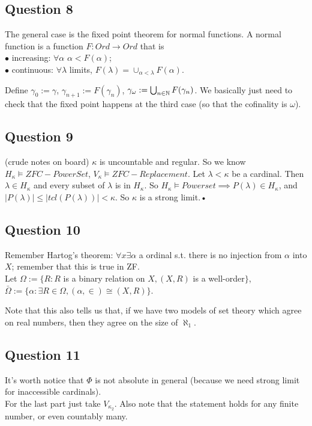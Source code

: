 \documentclass[a4paper]{article}
\begin{document}
\subsection{Question 8}
The general case is the fixed point theorem for normal functions. A normal function is a function $F:Ord \to Ord$ that is\\
$\bullet$ increasing: $\forall \alpha$ $\alpha < F(\alpha)$;\\
$\bullet$ continuous: $\forall \lambda$ limits, $F(\lambda) = \cup_{\alpha < \lambda} F(\alpha)$.

Define $\gamma_0 := \gamma$, $\gamma_{n+1} := F(\gamma_n)$, $\gamma_\omega := \bigcup_{n \in \mathbb{N}} F(\gamma_n)$. We basically just need to check that the fixed point happens at the third case (so that the cofinality is $\omega$).

\subsection{Question 9}
(crude notes on board) $\kappa$ is uncountable and regular. So we know $H_\kappa \vDash ZFC-PowerSet$, $V_\kappa \vDash ZFC-Replacement$. Let $\lambda < \kappa$ be a cardinal. Then $\lambda \in H_\kappa$ and every subset of $\lambda$ is in $H_\kappa$. So $H_\kappa \vDash Powerset \implies P(\lambda) \in H_\kappa$, and $|P(\lambda)| \leq |tcl(P(\lambda))| < \kappa$. So $\kappa$ is a strong limit.•

\subsection{Question 10}

Remember Hartog's theorem: $\forall x \exists \alpha$ a ordinal s.t. there is no injection from $\alpha$ into $X$; remember that this is true in ZF.\\
Let $\Omega := \{R: R$ is a binary relation on $X, (X,R)$ is a well-order$\}$,\\
$\bar{\Omega} := \{\alpha: \exists R \in \Omega, (\alpha,\in)\cong (X,R)\}$.

Note that this also tells us that, if we have two models of set theory which agree on real numbers, then they agree on the size of $\aleph_1$.

\subsection{Question 11}
It's worth notice that $\Phi$ is not absolute in general (because we need strong limit for inaccessible cardinals).\\
For the last part just take $V_{\kappa_2}$. Also note that the statement holds for any finite number, or even countably many.
\end{document}
